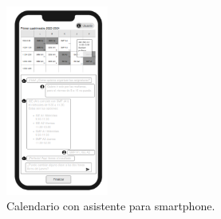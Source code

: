 \begin{figure}[H]
    \centering
    \includegraphics[width=0.3\textwidth]{./imagenes/Mockups_smartphone.png}
    \caption{Calendario con asistente para smartphone.}
\end{figure}


